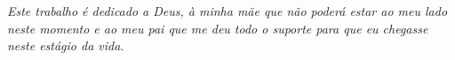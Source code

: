 \begin{dedicatoria}
   \vspace*{\fill}
   \centering
   \noindent
   \textit{Este trabalho é dedicado a Deus, à minha mãe que não poderá estar ao meu lado neste momento e ao meu pai que me deu todo o suporte para que eu chegasse neste estágio da vida.} \vspace*{\fill}
\end{dedicatoria}
